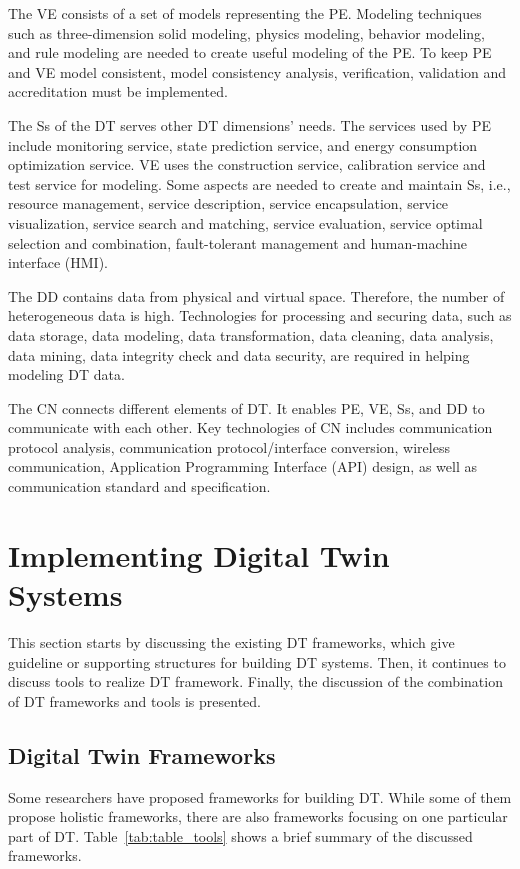 \documentclass[article,table]{aaltoseries}
\begin{document}
The VE consists of a set of models representing the PE. Modeling techniques such as three-dimension solid modeling, physics modeling, behavior modeling, and rule modeling are needed to create useful modeling of the PE. To keep PE and VE model consistent, model consistency analysis, verification, validation and accreditation must be implemented.

The Ss of the DT serves other DT dimensions' needs. The services used by PE include monitoring service, state prediction service, and energy consumption optimization service. VE uses the construction service, calibration service and test service for modeling. Some aspects are needed to create and maintain Ss, i.e., resource management, service description, service encapsulation, service visualization, service search and matching, service evaluation, service optimal selection and combination, fault-tolerant management and human-machine interface (HMI).

The DD contains data from physical and virtual space. Therefore, the number of heterogeneous data is high. Technologies for processing and securing data, such as data storage, data modeling, data transformation, data cleaning, data analysis, data mining, data integrity check and data security, are required in helping modeling DT data.

The CN connects different elements of DT. It enables PE, VE, Ss, and DD to communicate with each other. Key technologies of CN includes communication protocol analysis, communication protocol/interface conversion, wireless communication, Application Programming Interface (API) design, as well as communication standard and specification.

\section{Implementing Digital Twin Systems}
This section starts by discussing the existing DT frameworks, which give guideline or supporting structures for building DT systems. Then, it continues to discuss tools to realize DT framework. Finally, the discussion of the combination of DT frameworks and tools is presented.

\subsection{Digital Twin Frameworks}
Some researchers have proposed frameworks for building DT. While some of them propose holistic frameworks, there are also frameworks focusing on one particular part of DT. Table~\ref{tab:table_tools} shows a brief summary of the discussed frameworks.
\end{document}
